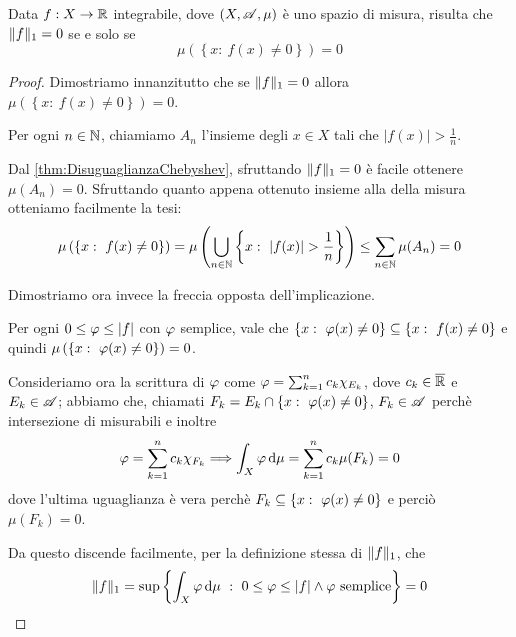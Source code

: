 \begin{lemma}\label{lemma:L1NullaAlloraNulla}
	Data $f:X\to\mathbb R$ integrabile, dove $(X,\mathscr A,\mu)$ è uno spazio di misura, risulta che $\Vert f\Vert_1=0$ se e solo se
	\begin{equation*}
		\mu\left(\left\{x:\ f(x)\not=0\right\}\right)=0
	\end{equation*}
\end{lemma}
\begin{proof}
	Dimostriamo innanzitutto che se $\Vert f\Vert_1=0$ allora $\mu\left(\left\{x:\ f(x)\not=0\right\}\right)=0$.

	Per ogni $n\in\mathbb N$, chiamiamo $A_n$ l'insieme degli $x\in X$ tali che $|f(x)|>\frac 1n$.
	
	Dal \cref{thm:DisuguaglianzaChebyshev}, sfruttando $\Vert f\Vert_1=0$ è facile ottenere $\mu(A_n)=0$. 
	Sfruttando quanto appena ottenuto insieme alla \sigsubadd[ità] della misura otteniamo facilmente la tesi:
	\begin{equation*}
		\mu\left(\left\{x:\ f(x)\not=0\right\}\right)=\mu\left(\bigcup_{n\in\N}\left\{x:\ |f(x)|>\frac1n\right\}\right)\le\sum_{n\in\N}\mu(A_n)=0
	\end{equation*}
	
	Dimostriamo ora invece la freccia opposta dell'implicazione.
	
	Per ogni $0\le \varphi \le |f|$ con $\varphi$ semplice, vale che $\left\{x:\ \simp(x)\not=0\right\}\subseteq\left\{x:\ f(x)\not=0\right\}$ e quindi $\mu\left(\left\{x:\ \simp(x)\not=0\right\}\right)=0$. 
	
	Consideriamo ora la scrittura di $\varphi$ come $\varphi=\sum_{k=1}^n c_k\chi_{E_k}$, dove $c_k\in\overline{\mathbb R}$ e $E_k\in\mathscr A$; abbiamo che, chiamati $F_k=E_k\cap \left\{x:\ \simp(x)\not=0\right\}$, $F_k\in\mathscr A$ perchè intersezione di misurabili e inoltre 
	\begin{equation*}
		\varphi=\sum_{k=1}^n c_k\chi_{F_k} \Longrightarrow \int_X\varphi\,\mathrm d\mu=\sum_{k=1}^n c_k\mu(F_k)=0
	\end{equation*}
	dove l'ultima uguaglianza è vera perchè $F_k\subseteq \left\{x:\ \simp(x)\not=0\right\}$ e perciò $\mu(F_k)=0$.
	
	Da questo discende facilmente, per la definizione stessa di $\Vert f\Vert_1$, che
	\begin{equation*}
		\Vert f\Vert_1=\sup\left\{ \int_X \varphi\,\mathrm d\mu\ :\ 0\le \varphi \le |f| \wedge \varphi \text{ semplice}\right\}=0
	\end{equation*}
\end{proof}

